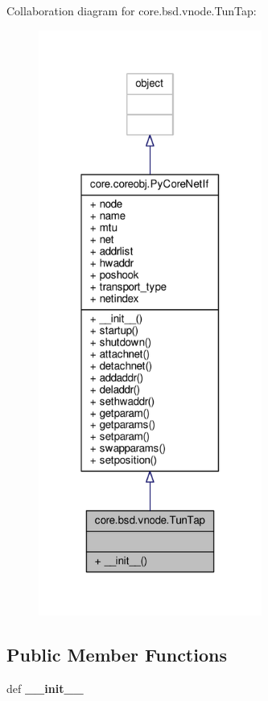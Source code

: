 Collaboration diagram for core.\+bsd.\+vnode.\+Tun\+Tap\+:
\nopagebreak
\begin{figure}[H]
\begin{center}
\leavevmode
\includegraphics[width=208pt]{classcore_1_1bsd_1_1vnode_1_1_tun_tap__coll__graph}
\end{center}
\end{figure}
\subsection*{Public Member Functions}
\begin{DoxyCompactItemize}
\item 
\hypertarget{classcore_1_1bsd_1_1vnode_1_1_tun_tap_a627656694d6f611adf701ba7c1b0184d}{def {\bfseries \+\_\+\+\_\+init\+\_\+\+\_\+}}\label{classcore_1_1bsd_1_1vnode_1_1_tun_tap_a627656694d6f611adf701ba7c1b0184d}

\end{DoxyCompactItemize}
